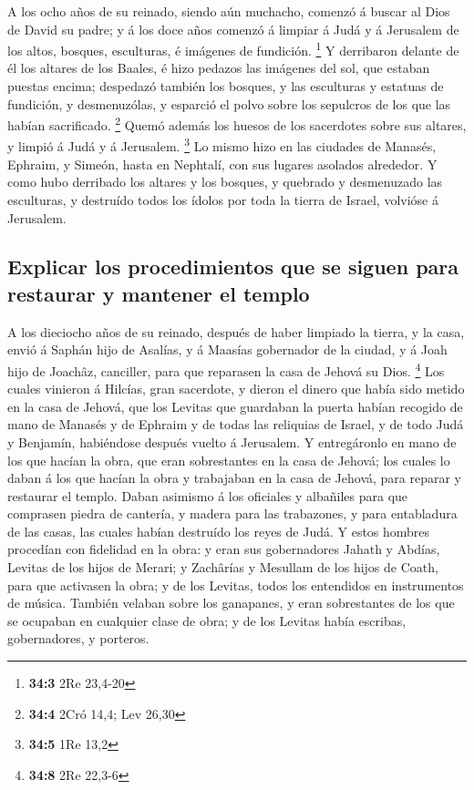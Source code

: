  A los ocho años de su reinado, siendo aún muchacho,
comenzó á buscar al Dios de David su padre; y á los doce años comenzó á
limpiar á Judá y á Jerusalem de los altos, bosques, esculturas, é
imágenes de fundición. \footnote{\textbf{34:3} 2Re 23,4-20}
 Y derribaron delante de él los altares de los Baales, é
hizo pedazos las imágenes del sol, que estaban puestas encima; despedazó
también los bosques, y las esculturas y estatuas de fundición, y
desmenuzólas, y esparció el polvo sobre los sepulcros de los que las
habían sacrificado. \footnote{\textbf{34:4} 2Cró 14,4; Lev 26,30}
 Quemó además los huesos de los sacerdotes sobre sus
altares, y limpió á Judá y á Jerusalem. \footnote{\textbf{34:5} 1Re 13,2}
 Lo mismo hizo en las ciudades de Manasés, Ephraim, y
Simeón, hasta en Nephtalí, con sus lugares asolados alrededor.
 Y como hubo derribado los altares y los bosques, y
quebrado y desmenuzado las esculturas, y destruído todos los ídolos por
toda la tierra de Israel, volvióse á Jerusalem.

\hypertarget{explicar-los-procedimientos-que-se-siguen-para-restaurar-y-mantener-el-templo}{%
\subsection{Explicar los procedimientos que se siguen para restaurar y
mantener el
templo}\label{explicar-los-procedimientos-que-se-siguen-para-restaurar-y-mantener-el-templo}}

 A los dieciocho años de su reinado, después de haber
limpiado la tierra, y la casa, envió á Saphán hijo de Asalías, y á
Maasías gobernador de la ciudad, y á Joah hijo de Joachâz, canciller,
para que reparasen la casa de Jehová su Dios. \footnote{\textbf{34:8}
  2Re 22,3-6}  Los cuales vinieron á Hilcías, gran
sacerdote, y dieron el dinero que había sido metido en la casa de
Jehová, que los Levitas que guardaban la puerta habían recogido de mano
de Manasés y de Ephraim y de todas las reliquias de Israel, y de todo
Judá y Benjamín, habiéndose después vuelto á Jerusalem. 
Y entregáronlo en mano de los que hacían la obra, que eran sobrestantes
en la casa de Jehová; los cuales lo daban á los que hacían la obra y
trabajaban en la casa de Jehová, para reparar y restaurar el templo.
 Daban asimismo á los oficiales y albañiles para que
comprasen piedra de cantería, y madera para las trabazones, y para
entabladura de las casas, las cuales habían destruído los reyes de Judá.
 Y estos hombres procedían con fidelidad en la obra: y
eran sus gobernadores Jahath y Abdías, Levitas de los hijos de Merari; y
Zachârías y Mesullam de los hijos de Coath, para que activasen la obra;
y de los Levitas, todos los entendidos en instrumentos de música.
 También velaban sobre los ganapanes, y eran sobrestantes
de los que se ocupaban en cualquier clase de obra; y de los Levitas
había escribas, gobernadores, y porteros.

